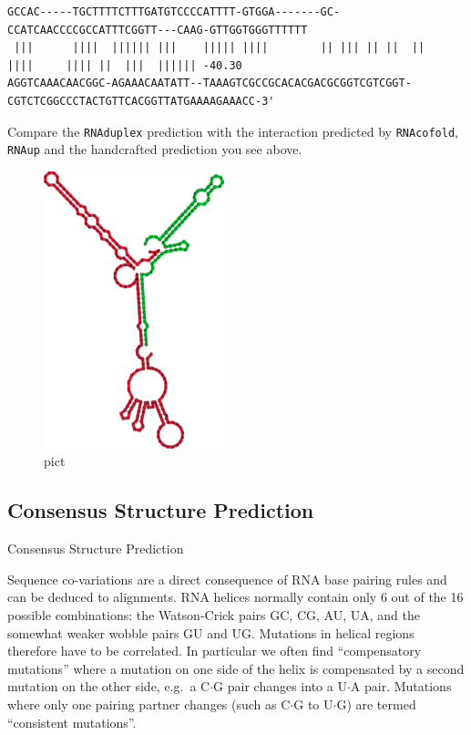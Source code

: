 \documentclass[]{article}
\begin{document}
\begin{verbatim}
GCCAC-----TGCTTTTCTTTGATGTCCCCATTTT-GTGGA-------GC-CCATCAACCCCGCCATTTCGGTT---CAAG-GTTGGTGGGTTTTTT
 |||      ||||  |||||| |||    ||||| ||||        || ||| || ||  ||    ||||     |||| ||  |||  |||||| -40.30
AGGTCAAACAACGGC-AGAAACAATATT--TAAAGTCGCCGCACACGACGCGGTCGTCGGT-CGTCTCGGCCCTACTGTTCACGGTTATGAAAAGAAACC-3'
\end{verbatim}

Compare the \texttt{RNAduplex} prediction with the interaction predicted
by \texttt{RNAcofold}, \texttt{RNAup} and the handcrafted prediction you
see above.

\begin{figure}[htbp]
\centering
\includegraphics{Figs/OmpN_cofold.png}
\caption{pict}
\end{figure}

\subsection{Consensus Structure Prediction}{Consensus Structure Prediction}\label{consensus-structure-prediction}

Sequence co-variations are a direct consequence of RNA base pairing
rules and can be deduced to alignments. RNA helices normally contain
only 6 out of the 16 possible combinations: the Watson-Crick pairs GC,
CG, AU, UA, and the somewhat weaker wobble pairs GU and UG. Mutations in
helical regions therefore have to be correlated. In particular we often
find ``compensatory mutations'' where a mutation on one side of the helix
is compensated by a second mutation on the other side, e.g.~a
C\(\cdot\)G pair changes into a U\(\cdot\)A pair. Mutations where only
one pairing partner changes (such as C\(\cdot\)G to U\(\cdot\)G) are
termed ``consistent mutations''.
\end{document}

